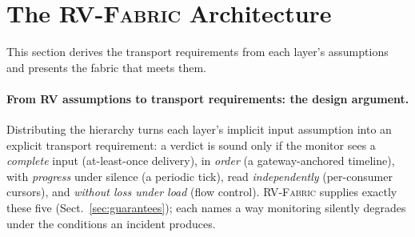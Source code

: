 \documentclass[runningheads]{llncs}
\newcommand{\sys}{\textsc{RV-Fabric}\xspace}
\begin{document}
\section{The \sys Architecture}
\label{sec:arch}
This section derives the transport requirements from each layer's assumptions and presents
the fabric that meets them.

\paragraph{From RV assumptions to transport requirements: the design argument.}
Distributing the hierarchy turns each layer's implicit input assumption into an explicit
transport requirement: a verdict is sound only if the monitor sees a \emph{complete} input
(at-least-once delivery), in \emph{order} (a gateway-anchored timeline), with
\emph{progress} under silence (a periodic tick), read \emph{independently} (per-consumer
cursors), and \emph{without loss under load} (flow control). \sys supplies exactly these
five (Sect.~\ref{sec:guarantees}); each names a way monitoring silently degrades under the
conditions an incident produces.
\end{document}
